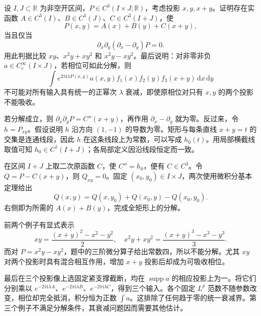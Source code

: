 \begin{optionalexercise}\label{b2:ex:25-new-1}
设 \(I,J\subset\mathbb R\) 为非空开区间，\(P\in C^3(I\times J;\mathbb R)\)，考虑投影 \(x,y,x+y\)。证明存在实函数
\(A\in C^3(I)\)、\(B\in C^3(J)\)、\(C\in C^3(I+J)\)，使
\[
 P(x,y)=A(x)+B(y)+C(x+y),
\]
当且仅当
\[
 \partial_x\partial_y(\partial_x-\partial_y)P=0.
\]
用此判据比较 \(xy\)、\(x^2y+xy^2\) 和 \(x^2y-xy^2\)。最后说明：对非零非负 \(a\in C_c^\infty(I\times J)\)，若相位可如此分解，则
\[
 \int e^{2\pi\mathrm i\lambda P(x,y)}a(x,y)
            f_1(x)f_2(y)f_3(x+y)\,\mathrm dx\,\mathrm dy
\]
不可能对所有输入具有统一的正幂次 \(\lambda\) 衰减，即使原相位对只有 \(x,y\) 的两个投影不能吸收。
\end{optionalexercise}
\begin{solution}
若分解成立，则 \(\partial_x\partial_yP=C''(x+y)\)，再作用 \(\partial_x-\partial_y\) 就为零。反过来，令 \(h=P_{xy}\)。假设说明 \(h\) 沿方向 \((1,-1)\) 的导数为零。矩形与每条直线 \(x+y=t\) 的交集是连通线段，因此 \(h\) 在这条线段上为常数，可以写成 \(h_0(t)\)。用局部横截线取值可知 \(h_0\in C^1(I+J)\)；各局部定义因沿线段恒定而一致。

在区间 \(I+J\) 上取二次原函数 \(C\)，使 \(C''=h_0\)，便有 \(C\in C^3\)。令 \(Q=P-C(x+y)\)，则 \(Q_{xy}=0\)。固定 \((x_0,y_0)\in I\times J\)，两次使用微积分基本定理给出
\[
 Q(x,y)=Q(x,y_0)+Q(x_0,y)-Q(x_0,y_0).
\]
右侧即为所需的 \(A(x)+B(y)\)，完成全矩形上的分解。

前两个例子有显式表示
\[
 xy=\frac{(x+y)^2-x^2-y^2}{2},
 \quad x^2y+xy^2=\frac{(x+y)^3-x^3-y^3}{3}.
\]
而对 \(P=x^2y-xy^2\)，题中的三阶微分算子给出常数四，所以不能分解。尤其 \(xy\) 对两个投影时具有混合相互作用，增加 \(x+y\) 投影后却成为可吸收相位。

最后在三个投影像上选固定紧支撑截断，均在 \(\operatorname{supp}a\) 的相应投影上为一。将它们分别乘以
\(e^{-2\pi\mathrm i\lambda A}\)、\(e^{-2\pi\mathrm i\lambda B}\)、\(e^{-2\pi\mathrm i\lambda C}\)，得到三个输入。各个固定 \(L^p\) 范数不随参数改变，相位却完全抵消，积分恒为正数 \(\int a\)。这排除了任何趋于零的统一衰减界。第三个例子不满足分解条件，其衰减问题因而需要其他估计。
\end{solution}

